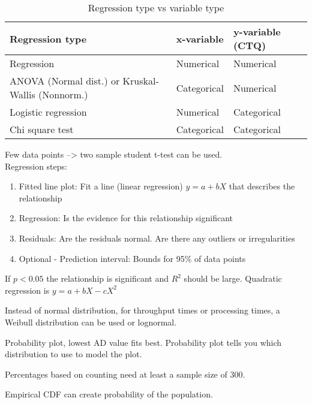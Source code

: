 \documentclass{notes}
\begin{document}
\begin{table}[htbp]
    \centering
    \begin{tabular}{l|l l}
    Regression type & x-variable & y-variable (CTQ) \\ \hline
    Regression & Numerical & Numerical \\
    ANOVA (Normal dist.) or Kruskal-Wallis (Nonnorm.) & Categorical & Numerical \\
    Logistic regression & Numerical & Categorical \\
    Chi square test & Categorical & Categorical \\
    \end{tabular}
    \caption{Regression type vs variable type}
\end{table}
Few data points --> two sample student t-test can be used.\\
Regression steps:
\begin{enumerate}[noitemsep]
    \item Fitted line plot: Fit a line (linear regression) $y = a + bX$ that describes the relationship
    \item Regression: Is the evidence for this relationship significant
    \item Residuals: Are the residuals normal. Are there any outliers or irregularities
    \item Optional - Prediction interval: Bounds for 95\% of data points
\end{enumerate}

If $p<0.05$ the relationship is significant and $R^2$ should be large. Quadratic regression is $y=a+bX-cX^2$

Instead of normal distribution, for throughput times or processing times, a Weibull distribution can be used or lognormal. 

Probability plot, lowest AD value fits best. Probability plot tells you which distribution to use to model the plot.

Percentages based on counting need at least a sample size of 300.

Empirical CDF can create probability of the population.
\end{document}
